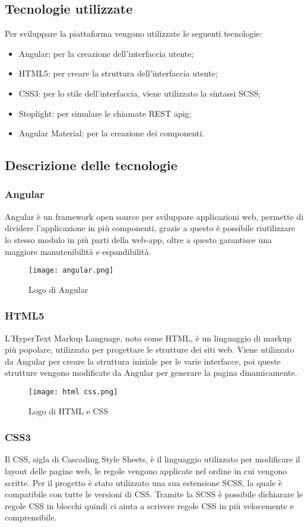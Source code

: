 \subsection{Tecnologie utilizzate}
Per sviluppare la piattaforma vengono utilizzate le seguenti tecnologie:
\begin{itemize}
    \item Angular: per la creazione dell'interfaccia utente;
    \item HTML5: per creare la struttura dell'interfaccia utente;
    \item CSS3: per lo stile dell'interfaccia, viene utilizzato la sintassi SCSS;
    \item Stoplight: per simulare le chiamate REST \gls{apig};
    \item Angular Material: per la creazione dei componenti.
\end{itemize}
\subsection{Descrizione delle tecnologie}
\subsubsection{Angular}
Angular è un framework open source per sviluppare applicazioni web, permette di dividere l'applicazione in più componenti, grazie a questo è possibile riutilizzare lo stesso modulo in più parti della web-app, oltre a questo garantisce una maggiore manutenibilità e espandibilità.
\begin{figure}[H]
    \centering
    \texttt{[image: angular.png]}
    \caption{Logo di Angular}
\end{figure}
\subsubsection{HTML5}
L'HyperText Markup Language, noto come HTML, è un linguaggio di markup più popolare, utilizzato per progettare le strutture dei siti web. Viene utilizzato da Angular per creare la struttura iniziale per le varie interfacce, poi queste strutture vengono modificate da Angular per generare la pagina dinamicamente.
\begin{figure}[H]
    \centering
    \texttt{[image: html css.png]}
    \caption{Logo di HTML e CSS}
\end{figure}
\subsubsection{CSS3}
Il CSS, sigla di Cascading Style Sheets, è il linguaggio utilizzato per modificare il layout delle pagine web, le regole vengono applicate nel ordine in cui vengono scritte. Per il progetto è stato utilizzato una sua estensione SCSS, la quale è compatibile con tutte le versioni di CSS. Tramite la SCSS è possibile dichiarare le regole CSS in blocchi quindi ci aiuta a scrivere regole CSS in più velocemente e comprensibile.
